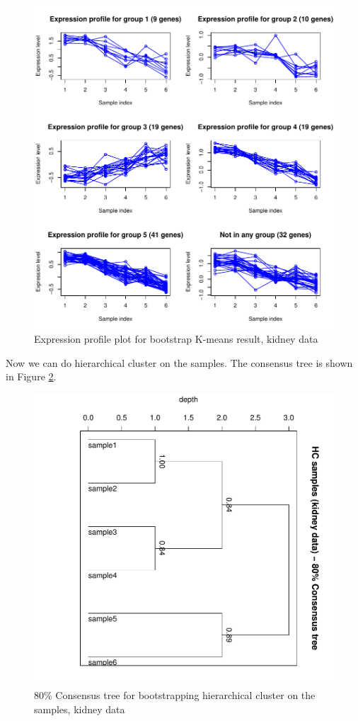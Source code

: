 \begin{figure}
\centering
\includegraphics{vgprofile}
\caption{Expression profile plot for bootstrap K-means result, kidney data}
\label{fig:vgprofile}
\end{figure}

Now we can do hierarchical cluster on the samples. The consensus tree 
is shown in Figure \ref{fig:hckidney}.

\begin{figure}[htbp]
\centering
\includegraphics{hckidney}
\caption{80\% Consensus tree for bootstrapping hierarchical cluster on the samples,
kidney data}
\label{fig:hckidney}
\end{figure}

